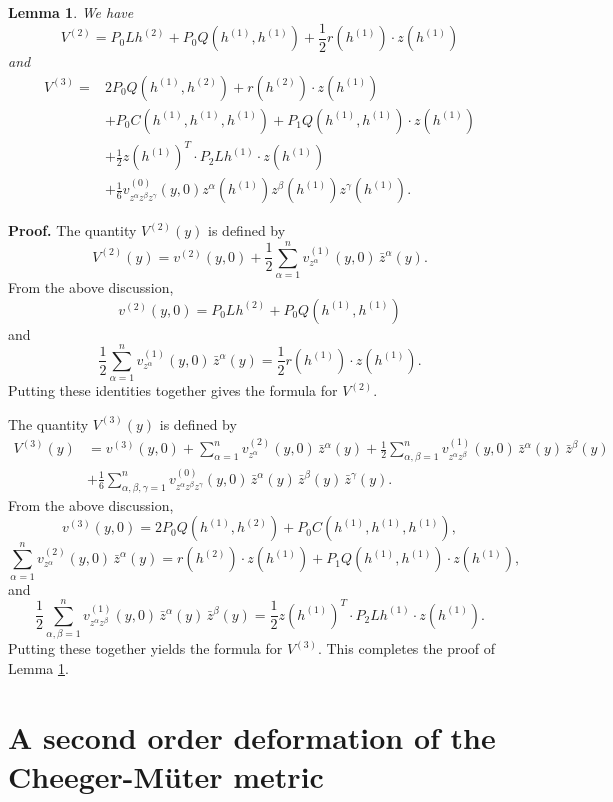 \documentclass[11pt]{amsart}
\newtheorem{lemma}[theorem]{Lemma}
\theoremstyle{definition}
\begin{document}
\begin{lemma}\label{Vk.formula}
We have
\[ V^{(2)}=P_0Lh^{(2)}+P_0Q(h^{(1)},h^{(1)})+\frac{1}{2}r(h^{(1)}) \cdot z (h^{(1)})\] 
and 
\begin{align*}
V^{(3)}=&2P_0Q(h^{(1)},h^{(2)})+r(h^{(2)})\cdot z(h^{(1)})\\
&+P_0C(h^{(1)},h^{(1)},h^{(1)})+P_1Q(h^{(1)},h^{(1)})\cdot z(h^{(1)})\\
&+\frac{1}{2}  z(h^{(1)})^T\cdot P_2Lh^{(1)}\cdot z(h^{(1)})\\
&+\frac{1}{6}v^{(0)}_{z^\alpha z^\beta z^\gamma}(y,0) z^{\alpha}(h^{(1)})z^{\beta}(h^{(1)})z^{\gamma}(h^{(1)}).
\end{align*}
\end{lemma}

\textbf{Proof.}
The quantity $V^{(2)}(y)$ is defined by
\[V^{(2)}(y) = v^{(2)}(y,0) + \frac{1}{2} \sum_{\alpha=1}^n v^{(1)}_{z^\alpha}(y,0) \, \bar{z}^\alpha(y).\] 
From the above discussion,
\[v^{(2)}(y,0)=P_0Lh^{(2)}+P_0Q(h^{(1)},h^{(1)})\]
and
\[\frac{1}{2} \sum_{\alpha=1}^n v^{(1)}_{z^\alpha}(y,0) \, \bar{z}^\alpha(y)=\frac{1}{2} r(h^{(1)})\cdot z(h^{(1)}).\]
Putting these identities together gives the formula for $V^{(2)}$.

The quantity $V^{(3)}(y)$ is defined by
\begin{align*} 
V^{(3)}(y) 
&= v^{(3)}(y,0) + \sum_{\alpha=1}^n v^{(2)}_{z^\alpha}(y,0) \, \bar{z}^\alpha(y) + \frac{1}{2} \sum_{\alpha,\beta=1}^n v^{(1)}_{z^\alpha z^\beta}(y,0) \, \bar{z}^\alpha(y) \, \bar{z}^\beta(y) \\ 
&+ \frac{1}{6} \sum_{\alpha,\beta,\gamma=1}^n v^{(0)}_{z^\alpha z^\beta z^\gamma}(y,0) \, \bar{z}^\alpha(y) \, \bar{z}^\beta(y) \, \bar{z}^\gamma(y). 
\end{align*}
From the above discussion,
\[v^{(3)}(y,0)=2P_0Q(h^{(1)},h^{(2)})+P_0C(h^{(1)},h^{(1)},h^{(1)}),\]
\[\sum_{\alpha=1}^n v^{(2)}_{z^\alpha}(y,0) \, \bar{z}^\alpha(y)= r(h^{(2)})\cdot z(h^{(1)})+P_1Q(h^{(1)},h^{(1)})\cdot z(h^{(1)}),\]
and
\[\frac{1}{2} \sum_{\alpha,\beta=1}^n v^{(1)}_{z^\alpha z^\beta}(y,0) \, \bar{z}^\alpha(y) \, \bar{z}^\beta(y)= \frac{1}{2}  z(h^{(1)})^T\cdot P_2Lh^{(1)}\cdot z(h^{(1)}).\]
Putting these together yields the formula for $V^{(3)}$. This completes the proof of Lemma \ref{Vk.formula}. \\


\section{A second order deformation of the Cheeger-M\"uter metric}
\end{document}
